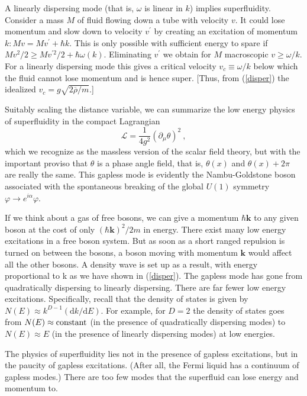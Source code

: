 \documentclass[11pt,a4paper]{article}
\renewcommand{\vec}[1]{\boldsymbol{#1}}
\newcommand{\dif}{\mathrm{d}}
\newcounter{theo}[section]\setcounter{theo}{0}
\begin{document}
A linearly dispersing mode (that is, $\omega$ is linear in $k$) implies superfluidity. Consider a mass $M$ of fluid flowing down a tube with velocity $v$. It could lose momentum and slow down to velocity $v^\prime$ by creating an excitation of momentum $k : Mv = Mv^\prime + \hbar k$. This is only possible with sufficient energy to spare if $Mv^2/2 \geqslant Mv^{\prime 2}/2 +\hbar \omega(k)$. Eliminating $v^\prime$ we obtain for $M$ macroscopic $v \geqslant \omega/k$. For a linearly dispersing mode this gives a critical velocity $v_c \equiv \omega/k$ below which the fluid cannot lose momentum and is hence super. [Thus, from (\ref{disper}) the idealized $v_c = g\sqrt{2 \overline{\rho}/m}$.]

Suitably scaling the distance variable, we can summarize the low energy physics of superfluidity in the compact Lagrangian
\begin{equation}
\mathcal L = \dfrac{1}{4g^2} (\partial_\mu \theta)^2 ~,
\end{equation}
which we recognize as the massless version of the scalar field theory, but with the important proviso that $\theta$ is a phase angle field, that is, $\theta(x)$ and $\theta(x) + 2\pi$ are really the same. This gapless mode is evidently the Nambu-Goldstone boson associated with the spontaneous breaking of the global $U(1)$ symmetry $\varphi \rightarrow e^{i\alpha} \varphi$.

If we think about a gas of free bosons, we can give a momentum  $\hbar \vec{k}$ to any given boson at the cost of only $(\hbar \vec{k})^2/2m$ in energy. There exist many low energy excitations in a free boson system. But as soon as a short ranged repulsion is turned on between the bosons, a boson moving with momentum $\vec{k}$ would affect all the other bosons. A density wave is set up as a result, with energy proportional to k as we have shown in (\ref{disper}). The gapless mode has gone from quadratically dispersing to linearly dispersing. There are far fewer low energy excitations. Specifically, recall that the density of states is given by $N(E) \approx k^{D-1} (\dif k/\dif E)$. For example, for $D = 2$ the density of states goes from $N(E) \approx \rm constant$ (in the presence of quadratically dispersing modes) to $N(E) \approx E$ (in the presence of linearly dispersing modes) at low energies.

The physics of superfluidity lies not in the presence of gapless excitations, but in the paucity of gapless excitations. (After all, the Fermi liquid has a continuum of gapless modes.) There are too few modes that the superfluid can lose energy and momentum to.
\end{document}
